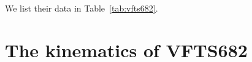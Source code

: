 \documentclass[apjl,twocolumn]{emulateapj}
\newcommand{\kms}{{\,\mathrm{km\ s^{-1}}}}
\newcommand{\masyr}{\,\mathrm{mas}\,\mathrm{yr}^{-1}}
\DeclareRobustCommand{\Tabref}[1]{Table~\ref{#1}}
\begin{document}
We list their data in \Tabref{tab:vfts682}.  













\section{The kinematics of VFTS682}
\label{sec:results}
\end{document}
